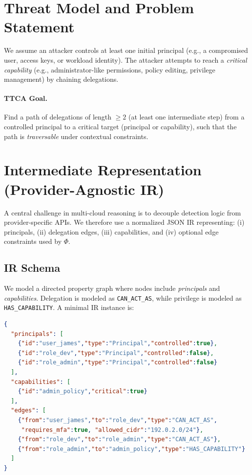 \documentclass[a4paper,11pt]{article}
\begin{document}
\section{Threat Model and Problem Statement}
We assume an attacker controls at least one initial principal (e.g., a compromised user, access keys, or workload identity). The attacker attempts to reach a \textit{critical capability} (e.g., administrator-like permissions, policy editing, privilege management) by chaining delegations.

\paragraph{TTCA Goal.} Find a path of delegations of length $\ge 2$ (at least one intermediate step) from a controlled principal to a critical target (principal or capability), such that the path is \textit{traversable} under contextual constraints.

\section{Intermediate Representation (Provider-Agnostic IR)}
A central challenge in multi-cloud reasoning is to decouple detection logic from provider-specific APIs. We therefore use a normalized JSON IR representing:
(i) principals, (ii) delegation edges, (iii) capabilities, and (iv) optional edge constraints used by $\Phi$.

\subsection{IR Schema}
We model a directed property graph where nodes include \textit{principals} and \textit{capabilities}. Delegation is modeled as \texttt{CAN\_ACT\_AS}, while privilege is modeled as \texttt{HAS\_CAPABILITY}. A minimal IR instance is:

\begin{lstlisting}[language=json]
{
  "principals": [
    {"id":"user_james","type":"Principal","controlled":true},
    {"id":"role_dev","type":"Principal","controlled":false},
    {"id":"role_admin","type":"Principal","controlled":false}
  ],
  "capabilities": [
    {"id":"admin_policy","critical":true}
  ],
  "edges": [
    {"from":"user_james","to":"role_dev","type":"CAN_ACT_AS",
     "requires_mfa":true, "allowed_cidr":"192.0.2.0/24"},
    {"from":"role_dev","to":"role_admin","type":"CAN_ACT_AS"},
    {"from":"role_admin","to":"admin_policy","type":"HAS_CAPABILITY"}
  ]
}
\end{lstlisting}
\end{document}
